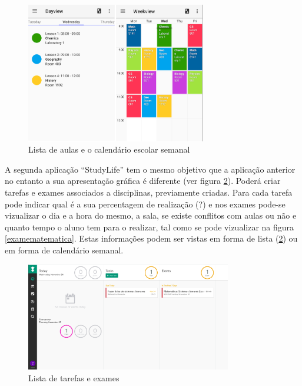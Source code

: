 \documentclass[11pt, twoside]{report}
\begin{document}
	\begin{figure}[H] 
		\centering 
		\includegraphics[width=0.7\textwidth,height=0.7\textheight,keepaspectratio]{image/estadodearte/dayweekview}
		\caption{Lista de aulas e o calendário escolar semanal}
		\label{dayweekview}
	\end{figure}

	A segunda aplicação ``StudyLife'' tem o mesmo objetivo que a aplicação anterior no entanto a sua apresentação gráfica é diferente (ver figura \ref{listastudylife}). Poderá criar tarefas e exames associados a disciplinas, previamente criadas. Para cada tarefa pode indicar qual é a sua percentagem de realização (?) e nos exames pode-se vizualizar o dia e a hora do mesmo, a sala, se existe conflitos com aulas ou não e quanto tempo o aluno tem para o realizar, tal como se pode vizualizar na figura \ref{examematematica}. Estas informações podem ser vistas em forma de lista (\ref{listastudylife}) ou em forma de calendário semanal.
	
	
\begin{figure}[H] 
	\centering 
	\includegraphics[width=0.8\textwidth,height=0.8\textheight,keepaspectratio]{image/estadodearte/calendario}
	\caption{Lista de tarefas e exames}
	\label{listastudylife}
\end{figure}
\end{document}
